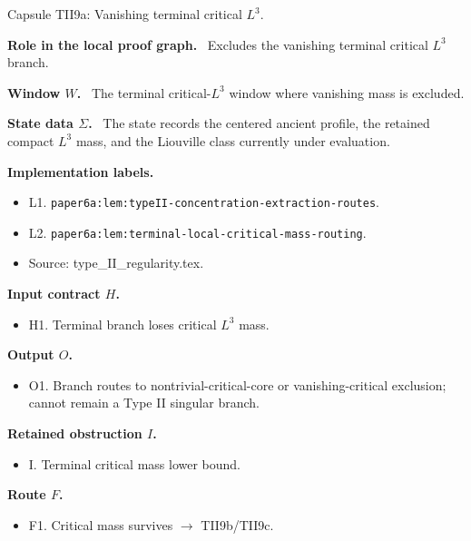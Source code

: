 \documentclass[11pt]{amsart}
\newcommand{\capsulefield}[1]{\par\smallskip\noindent\textbf{#1.}\ }
\begin{document}
\begin{proofcapsule}{Capsule TII9a: Vanishing terminal critical $L^3$.}
  \capsulefield{Role in the local proof graph}
  Excludes the vanishing terminal critical \(L^3\) branch.

  \capsulefield{Window \(W\)}
The terminal critical-$L^3$ window where vanishing mass is excluded.

  \capsulefield{State data \(\Sigma\)}
The state records the centered ancient profile, the retained compact $L^3$ mass, and the Liouville class currently under evaluation.

  \capsulefield{Implementation labels}
  \begin{itemize}[leftmargin=1.8em]
  \item L1. \texttt{paper6a:lem:typeII-concentration-extraction-routes}.
  \item L2. \texttt{paper6a:lem:terminal-local-critical-mass-routing}.
  \item Source: type\_II\_regularity.tex.
  \end{itemize}

  \capsulefield{Input contract \(H\)}
  \begin{itemize}[leftmargin=1.8em]
  \item H1. Terminal branch loses critical $L^3$ mass.
  \end{itemize}

  \capsulefield{Output \(O\)}
  \begin{itemize}[leftmargin=1.8em]
  \item O1. Branch routes to nontrivial-critical-core or vanishing-critical exclusion; cannot remain a Type II singular branch.
  \end{itemize}

  \capsulefield{Retained obstruction \(I\)}
  \begin{itemize}[leftmargin=1.8em]
  \item I. Terminal critical mass lower bound.
  \end{itemize}

  \capsulefield{Route \(F\)}
  \begin{itemize}[leftmargin=1.8em]
  \item F1. Critical mass survives $\to$ TII9b/TII9c.
  \end{itemize}


\end{proofcapsule}
\end{document}
